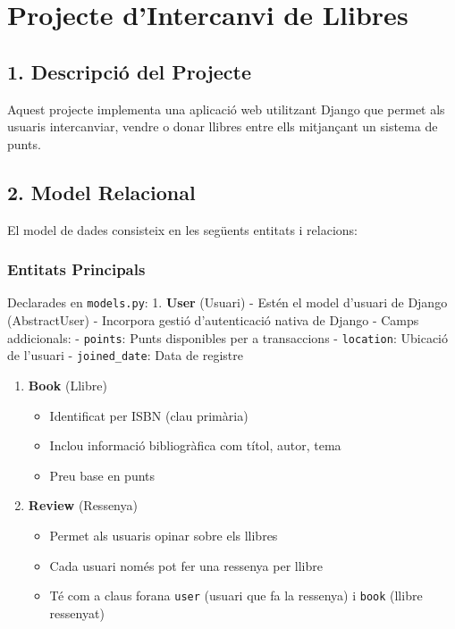 \hypertarget{projecte-dintercanvi-de-llibres}{%
\section{Projecte d'Intercanvi de
Llibres}\label{projecte-dintercanvi-de-llibres}}

\hypertarget{descripciuxf3-del-projecte}{%
\subsection{1. Descripció del
Projecte}\label{descripciuxf3-del-projecte}}

Aquest projecte implementa una aplicació web utilitzant Django que
permet als usuaris intercanviar, vendre o donar llibres entre ells
mitjançant un sistema de punts.

\hypertarget{model-relacional}{%
\subsection{2. Model Relacional}\label{model-relacional}}

El model de dades consisteix en les següents entitats i relacions:

\hypertarget{entitats-principals}{%
\subsubsection{Entitats Principals}\label{entitats-principals}}

Declarades en \texttt{models.py}: 1. \textbf{User} (Usuari) - Estén el
model d'usuari de Django (AbstractUser) - Incorpora gestió
d'autenticació nativa de Django - Camps addicionals: - \texttt{points}:
Punts disponibles per a transaccions - \texttt{location}: Ubicació de
l'usuari - \texttt{joined\_date}: Data de registre

\begin{enumerate}
\def\labelenumi{\arabic{enumi}.}
\setcounter{enumi}{1}
\tightlist
\item
  \textbf{Book} (Llibre)

  \begin{itemize}
  \tightlist
  \item
    Identificat per ISBN (clau primària)
  \item
    Inclou informació bibliogràfica com títol, autor, tema
  \item
    Preu base en punts
  \end{itemize}
\item
  \textbf{Review} (Ressenya)

  \begin{itemize}
  \tightlist
  \item
    Permet als usuaris opinar sobre els llibres
  \item
    Cada usuari només pot fer una ressenya per llibre
  \item
    Té com a claus forana \texttt{user} (usuari que fa la ressenya) i
    \texttt{book} (llibre ressenyat)
  \end{itemize}
\end{enumerate}

